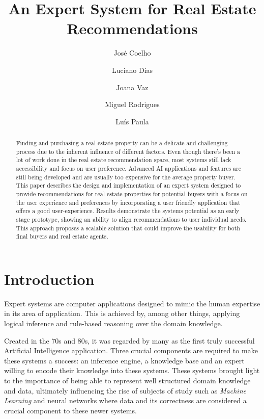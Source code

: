 \documentclass[runningheads]{llncs}
\begin{document}
%
\title{An Expert System for Real Estate Recommendations}
%
%
\author{José Coelho \and Luciano Dias
\and Joana Vaz \and Miguel Rodrigues  \and Luís Paula }

%
\maketitle              %
%
\begin{abstract}
Finding and purchasing a real estate property can be a delicate and challenging process due to the inherent influence of different factors. Even though there's been a lot of work done in the real estate recommendation space, most systems still lack accessibility and focus on user preference. Advanced AI applications and features are still being developed and are usually too expensive for the average property buyer. This paper describes the design and implementation of an expert system designed to provide recommendations for real estate properties for potential buyers with a focus on the user experience and preferences by incorporating a user friendly application that offers a good user-experience. Results demonstrate the systems potential as an early stage prototype, showing an ability to align recommendations to user individual needs. This approach proposes a scalable solution that could improve the usability for both final buyers and real estate agents.

\end{abstract}
%
%
%
\section{Introduction}

Expert systems are computer applications designed to mimic the human expertise in its area of application. This is achieved by, among other things, applying logical inference and rule-based reasoning over the domain knowledge.

Created in the 70s and 80s, it was regarded by many as the first truly successful Artificial Intelligence application. Three crucial components are required to make these systems a success: an inference engine, a knowledge base and an expert willing to encode their knowledge into these systems.
These systems brought light to the importance of being able to represent well structured domain knowledge and data, ultimately influencing the rise of subjects of study such as \textit{Machine Learning} and neural networks where data and its correctness are considered a crucial component to these newer systems.
\end{document}
